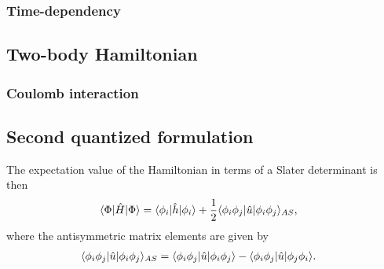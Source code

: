             \subsubsection{Time-dependency}
        \subsection{Two-body Hamiltonian}
            \subsubsection{Coulomb interaction}
        \subsection{Second quantized formulation}
        The expectation value of the Hamiltonian in terms of a Slater
        determinant is then
        \begin{align}
            \langle \Phi |\hat{H}| \Phi \rangle
            &= \langle \phi_i |\hat{h}| \phi_i \rangle
            + \frac{1}{2}\langle \phi_i\phi_j |\hat{u}| \phi_i\phi_j \rangle_{AS},
        \end{align}
        where the antisymmetric matrix elements are given by
        \begin{align}
            \langle \phi_i\phi_j |\hat{u}| \phi_i\phi_j \rangle_{AS}
            &= \langle \phi_i\phi_j |\hat{u}| \phi_i\phi_j \rangle
            - \langle \phi_i\phi_j |\hat{u}| \phi_j\phi_i \rangle.
            \label{eq:antisymmetric_two_body}
        \end{align}

